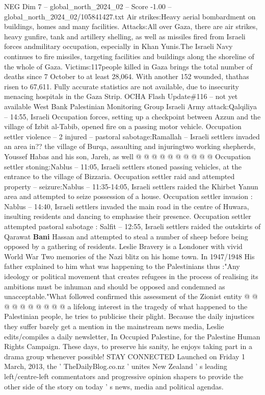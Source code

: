 \begin{textsample}{NEG Dim 7 – global\_north\_2024\_02 – Score -1.00 – global\_north\_2024\_02/105841427.txt}  \label{ex:f7_neg_431}
Air strikes:Heavy aerial bombardment on buildings, homes and many facilities.
Attacks:All over Gaza, there are air strikes, heavy gunfire, tank and artillery shelling, as well as missiles fired from Israeli forces andmilitary occupation, especially in Khan Yunis.The Israeli Navy continues to fire missiles, targeting facilities and buildings along the shoreline of the whole of Gaza.
Victims:117people killed in Gaza brings the total number of deaths since 7 October to at least 28,064.
With another 152 wounded, thathas risen to 67,611.
Fully accurate statistics are not available, due to insecurity menacing hospitals in the Gaza Strip.
OCHA Flash Update\#116 -- not yet available West Bank Palestinian Monitoring Group Israeli Army attack:Qalqiliya -- 14:55, Israeli Occupation forces, setting up a checkpoint between Azzun and the village of Izbit al-Tabib, opened fire on a passing motor vehicle.
Occupation settler violence -- 2 injured -- pastoral sabotage:Ramallah -- Israeli settlers invaded an area in?? the village of Burqa, assaulting and injuringtwo working shepherds, Youssef Habas and his son, Jareh, as well @ @ @ @ @ @ @ @ @ @ Occupation settler stoning:Nablus -- 11:05, Israeli settlers stoned passing vehicles, at the entrance to the village of Bizzaria.
Occupation settler raid and attempted property -- seizure:Nablus -- 11:35-14:05, Israeli settlers raided the Khirbet Yanun area and attempted to seize possession of a house.
Occupation settler invasion : Nablus -- 14:40, Israeli settlers invaded the main road in the centre of Huwara, insulting residents and dancing to emphasise their presence.
Occupation settler attempted pastoral sabotage : Salfit -- 12:55, Israeli settlers raided the outskirts of Qarawat \textbf{Bani} Hassan and attempted to steal a number of sheep before being opposed by a gathering of residents.
Leslie Bravery is a Londoner with vivid World War Two memories of the Nazi blitz on his home town.
In 1947/1948 His father explained to him what was happening to the Palestinians thus :"Any ideology or political movement that creates refugees in the process of realising its ambitions must be inhuman and should be opposed and condemned as unacceptable."What followed confirmed this assessment of the Zionist entity @ @ @ @ @ @ @ @ @ @ a lifelong interest in the tragedy of what happened to the Palestinian people, he tries to publicise their plight.
Because the daily injustices they suffer barely get a mention in the mainstream news media, Leslie edits/compiles a daily newsletter, In Occupied Palestine, for the Palestine Human Rights Campaign.
These days, to preserve his sanity, he enjoys taking part in a drama group whenever possible!
STAY CONNECTED Launched on Friday 1 March, 2013, the ' TheDailyBlog.co.nz ' unites New Zealand ' s leading left/centre-left commentators and progressive opinion shapers to provide the other side of the story on today ' s news, media and political agendas.

\end{textsample}
